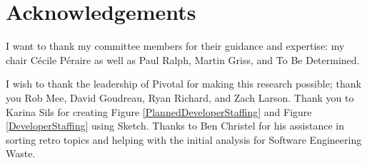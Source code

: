 \documentclass[oneside,letterpaper]{memoir}
\begin{document}
\frontmatter

\thetitlepage
\copyrightpage

\section*{Acknowledgements}
I want to thank my committee members for their guidance and expertise: my chair
 C\'ecile P\'eraire as well as Paul Ralph, Martin Griss, and To Be Determined. 

I wish to thank the leadership of Pivotal for making this research possible; thank you Rob Mee, David Goudreau, Ryan Richard, and Zach Larson. Thank you to Karina Sils for creating Figure \ref{PlannedDeveloperStaffing} and Figure \ref{DeveloperStaffing} using Sketch. Thanks to Ben Christel for his assistance in sorting retro topics and helping with the initial analysis for Software Engineering Waste.



\newpage
\tableofcontents
\listoftables
\listoffigures

\mainmatter



% 
% 
% 

% 
% 
% 
% 
% 
% 
% 



\appendix


% 
% 
% 
% 
% 

% 
% 

\backmatter
\end{document}
